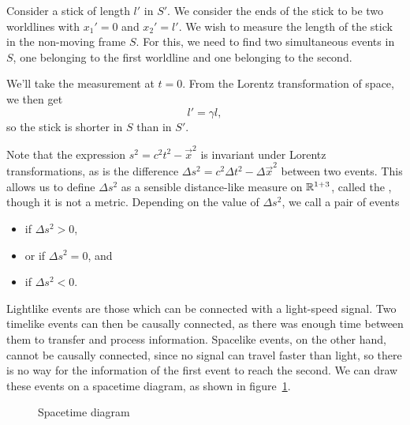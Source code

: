 \begin{example}
  Consider a stick of length $l'$ in $S'$.
  We consider the ends of the stick to be two worldlines with $x_1' = 0$ and
  $x_2' = l'$.
  We wish to measure the length of the stick in the non-moving frame $S$.
  For this, we need to find two simultaneous events in $S$, one belonging to the
  first worldline and one belonging to the second.

  We'll take the measurement at $t=0$.
  From the Lorentz transformation of space, we then get
  \[
	l' = \gamma l,
  \]
  so the stick is shorter in $S$ than in $S'$.
\end{example}

Note that the expression $s^2 = c^2 t^2 - \vec{x}^2$ is invariant under Lorentz
transformations, as is the difference $\Delta s^2 = c^2 \Delta t^2 - \Delta
\vec{x}^2$ between two events.
This allows us to define $\Delta s^2$ as a sensible distance-like measure on
$\mathbb{R}^{1+3}$, called the , though it is not a metric.
Depending on the value of $\Delta s^2$, we call a pair of events
\begin{itemize}
\item {} if $\Delta s^2 > 0$,
\item {} or  if $\Delta s^2 = 0$, and
\item {} if $\Delta s^2 < 0$.
\end{itemize}
Lightlike events are those which can be connected with a light-speed signal.
Two timelike events can then be causally connected, as there was enough time
between them to transfer and process information.
Spacelike events, on the other hand, cannot be causally connected, since no
signal can travel faster than light, so there is no way for the information of
the first event to reach the second.
We can draw these events on a spacetime diagram, as shown in
figure~\ref{fig:spacetime-diagram-events}.

\begin{figure}[h!]
  \centering
  \caption{Spacetime diagram}%
  \label{fig:spacetime-diagram-events}
\end{figure}

